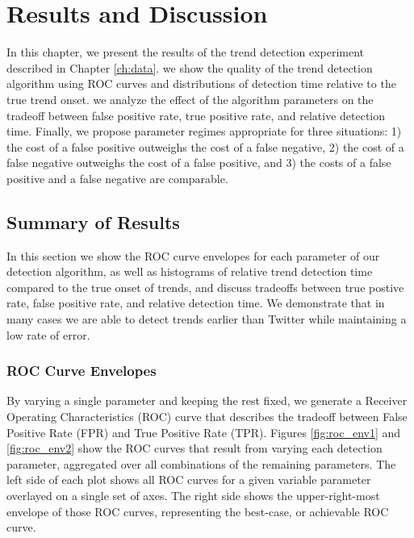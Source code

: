 \chapter{Results and Discussion}
\label{ch:results}

In this chapter, we present the results of the trend detection experiment
described in Chapter \ref{ch:data}. we show the quality of the trend detection
algorithm using ROC curves and distributions of detection time relative to the
true trend onset. we analyze the effect of the algorithm parameters on the
tradeoff between false positive rate, true positive rate, and relative detection
time. Finally, we propose parameter regimes appropriate for three situations: 1)
the cost of a false positive outweighs the cost of a false negative, 2) the cost
of a false negative outweighs the cost of a false positive, and 3) the costs of
a false positive and a false negative are comparable.

\section{Summary of Results}

In this section we show the ROC curve envelopes for each parameter of our
detection algorithm, as well as histograms of relative trend detection time
compared to the true onset of trends, and discuss tradeoffs between true postive
rate, false positive rate, and relative detection time. We demonstrate that in
many cases we are able to detect trends earlier than Twitter while maintaining a
low rate of error.

\subsection{ROC Curve Envelopes}
By varying a single parameter and keeping the rest fixed, we generate a Receiver
Operating Characteristics (ROC) curve that describes the tradeoff between False
Positive Rate (FPR) and True Positive Rate (TPR). Figures \ref{fig:roc_env1} and
\ref{fig:roc_env2} show the ROC curves that result from varying each detection
parameter, aggregated over all combinations of the remaining parameters. The
left side of each plot shows all ROC curves for a given variable parameter
overlayed on a single set of axes. The right side shows the upper-right-most
envelope of those ROC curves, representing the best-case, or achievable ROC
curve.

